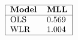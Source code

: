 \documentclass[10pt]{article}
\begin{document}
\begin{align*}\begin{tabular}{|ll|}
\hline
\textbf{Model} & \textbf{MLL} \\
\hline
OLS & 0.569 \\
WLR & 1.004 \\
\hline
\end{tabular}\end{align*}
\end{document}
